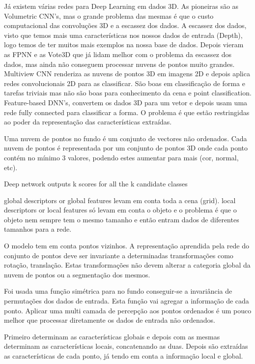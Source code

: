             Já existem várias redes para Deep Learning em dados 3D. As pioneiras são as Volumetric CNN's, mas o grande problema das mesmas é que o custo computacional das convoluções 3D e a escassez dos dados. A escassez dos dados, visto que temos mais uma características nos nossos dados de entrada (Depth), logo temos de ter muitos mais exemplos na nossa base de dados. 
            Depois vieram as FPNN e as Vote3D que já lidam melhor com o problema da escassez dos dados, mas ainda não conseguem processar nuvens de pontos muito grandes. 
            Multiview CNN renderiza as nuvens de pontos 3D em imagens 2D e depois aplica redes convolucionais 2D para as classificar. São boas em classificação de forma e tarefas triviais mas não são boas para conhecimento da cena e point classification.
            Feature-based DNN's, convertem os dados 3D para um vetor e depois usam uma rede fully connected para classificar a forma. O problema é que estão restringidas ao poder da representação das características extraídas.
            
            Uma nuvem de pontos no fundo é um conjunto de vectores não ordenados. Cada nuvem de pontos é representada por um conjunto de pontos 3D onde cada ponto contém no mínimo 3 valores, podendo estes aumentar para mais (cor, normal, etc).
            
            Deep network outputs k scores for all the k candidate classes

            global descriptors or global features levam em conta toda a cena (grid).
            local descriptors or local features só levam em conta o objeto e o problema é que o objeto nem sempre tem o mesmo tamanho e então entram dados de diferentes tamanhos para a rede.
            
            O modelo tem em conta pontos vizinhos. A representação aprendida pela rede do conjunto de pontos deve ser invariante a determinadas transformações como rotação, translação. Estas transformações não devem alterar a categoria global da nuvem de pontos ou a segmentação dos mesmos.
            
            Foi usada uma função simétrica para no fundo conseguir-se a invariância de permutações dos dados de entrada. Esta função vai agregar a informação de cada ponto. Aplicar uma multi camada de percepção aos pontos ordenados é um pouco melhor que processar diretamente os dados de entrada não ordenados.
            
            Primeiro determinam as características globais e depois com as mesmas determinam as características locais, concatenando as duas. Depois são extraídas as características de cada ponto, já tendo em conta a informação local e global.
            
